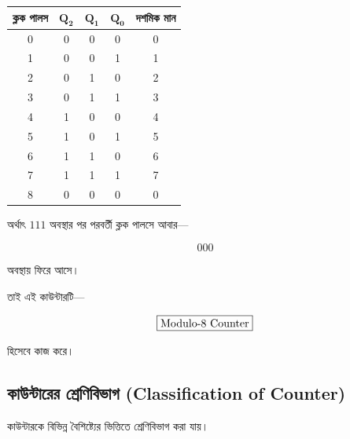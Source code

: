 \begin{center}
\renewcommand{\arraystretch}{1.2}

\begin{tabular}{|c|c|c|c|c|}
\hline

\rowcolor{ICTLightBlue}

\textbf{ক্লক পালস}
&
\(\boldsymbol{Q_2}\)
&
\(\boldsymbol{Q_1}\)
&
\(\boldsymbol{Q_0}\)
&
\textbf{দশমিক মান}
\\
\hline

0 & 0 & 0 & 0 & 0 \\
\hline

1 & 0 & 0 & 1 & 1 \\
\hline

2 & 0 & 1 & 0 & 2 \\
\hline

3 & 0 & 1 & 1 & 3 \\
\hline

4 & 1 & 0 & 0 & 4 \\
\hline

5 & 1 & 0 & 1 & 5 \\
\hline

6 & 1 & 1 & 0 & 6 \\
\hline

7 & 1 & 1 & 1 & 7 \\
\hline

8 & 0 & 0 & 0 & 0 \\
\hline

\end{tabular}
\end{center}

অর্থাৎ \(111\) অবস্থার পর পরবর্তী ক্লক পালসে আবার—

\[
000
\]

অবস্থায় ফিরে আসে।

তাই এই কাউন্টারটি—

\[
\boxed{
\text{\textenglish{Modulo-8 Counter}}
}
\]

হিসেবে কাজ করে।



\subsection{কাউন্টারের শ্রেণিবিভাগ
(\textenglish{Classification of Counter})}

কাউন্টারকে বিভিন্ন বৈশিষ্ট্যের ভিত্তিতে শ্রেণিবিভাগ করা যায়।

